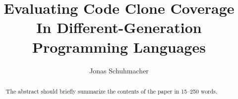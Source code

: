 \documentclass[runningheads]{llncs}
\begin{document}
%
\title{Evaluating Code Clone Coverage In Different-Generation Programming Languages}
%
%
%
\author{Jonas Schuhmacher}
%
\maketitle %
%
%
\begin{abstract}
The abstract should briefly summarize the contents of the paper in
15--250 words.
\end{abstract}
%
%







%
%
\appendix

%
%


%
\end{document}
